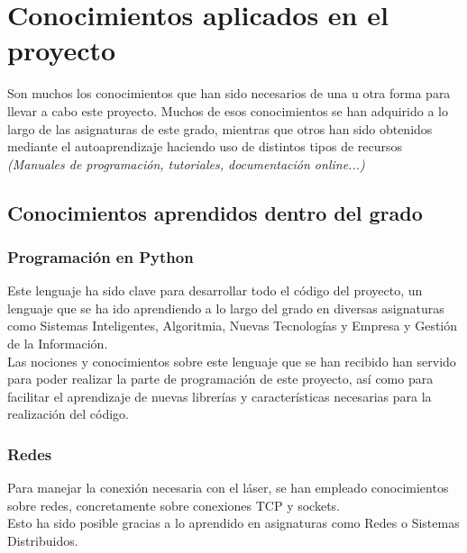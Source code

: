 
\section{Conocimientos aplicados en el proyecto}

Son muchos los conocimientos que han sido necesarios de una u otra forma para llevar a cabo este proyecto. Muchos de esos conocimientos se han adquirido a lo largo de las asignaturas de este grado, mientras que otros han sido obtenidos mediante el autoaprendizaje haciendo uso de distintos tipos de recursos \textit{(Manuales de programación, tutoriales, documentación online...)}\\
	
\subsection{Conocimientos aprendidos dentro del grado}
	\subsubsection{Programación en Python}
		Este lenguaje ha sido clave para desarrollar todo el código del proyecto, un lenguaje que se ha ido aprendiendo a lo largo del grado en diversas asignaturas como Sistemas 					Inteligentes, Algoritmia, Nuevas Tecnologías y Empresa y Gestión de la Información.\\
		Las nociones y conocimientos sobre este lenguaje que se han recibido han servido para poder realizar la parte de programación de este proyecto, así como para facilitar el 					aprendizaje de nuevas librerías y características necesarias para la realización del código.\\
	\subsubsection{Redes}
		Para manejar la conexión necesaria con el láser, se han empleado conocimientos sobre redes, concretamente sobre conexiones TCP y sockets. \\ Esto ha sido posible gracias a lo 				aprendido en asignaturas como Redes o Sistemas Distribuidos.\\
